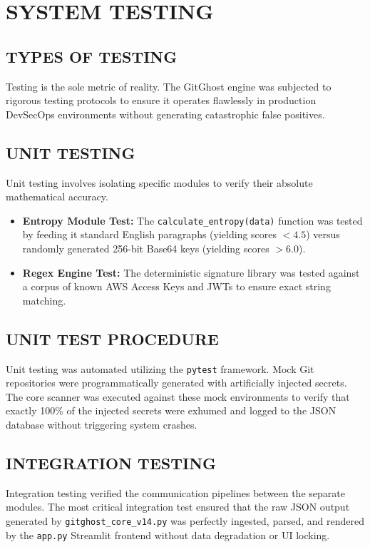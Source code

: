 \documentclass[12pt, a4paper, oneside]{report}
\begin{document}
\chapter{SYSTEM TESTING}

\section{TYPES OF TESTING}
Testing is the sole metric of reality. The GitGhost engine was subjected to rigorous testing protocols to ensure it operates flawlessly in production DevSecOps environments without generating catastrophic false positives.

\section{UNIT TESTING}
Unit testing involves isolating specific modules to verify their absolute mathematical accuracy.
\begin{itemize}
    \item \textbf{Entropy Module Test:} The \texttt{calculate\_entropy(data)} function was tested by feeding it standard English paragraphs (yielding scores $< 4.5$) versus randomly generated 256-bit Base64 keys (yielding scores $> 6.0$).
    \item \textbf{Regex Engine Test:} The deterministic signature library was tested against a corpus of known AWS Access Keys and JWTs to ensure exact string matching.
\end{itemize}

\section{UNIT TEST PROCEDURE}
Unit testing was automated utilizing the \texttt{pytest} framework. Mock Git repositories were programmatically generated with artificially injected secrets. The core scanner was executed against these mock environments to verify that exactly 100\% of the injected secrets were exhumed and logged to the JSON database without triggering system crashes.

\section{INTEGRATION TESTING}
Integration testing verified the communication pipelines between the separate modules. The most critical integration test ensured that the raw JSON output generated by \texttt{gitghost\_core\_v14.py} was perfectly ingested, parsed, and rendered by the \texttt{app.py} Streamlit frontend without data degradation or UI locking.
\end{document}
